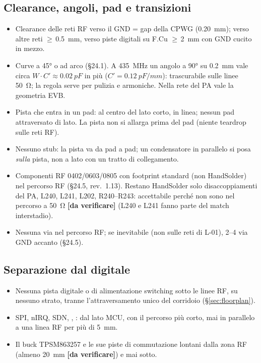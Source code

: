 \documentclass[a4paper,10pt]{article}
\newcommand{\net}[1]{\texttt{\detokenize{#1}}}
\newcommand{\dv}{\textcolor{verfr}{\textbf{[da verificare]}}}
\newcounter{regola}
\begin{document}
\subsection{Clearance, angoli, pad e transizioni}
\begin{regola}
\begin{itemize}
\item Clearance delle reti RF verso il GND = gap della CPWG (\SI{0.20}{mm}); verso altre reti
      $\ge$\,\SI{0.5}{mm}, verso piste digitali su F.Cu $\ge$\,\SI{2}{mm} con GND cucito in mezzo.
\item Curve a \ang{45} o ad arco (\S24.1). A \SI{435}{MHz} un angolo a \ang{90} su \SI{0.2}{mm} vale circa
      $W\cdot C'\approx\SI{0.02}{pF}$ in più ($C'=\SI{0.12}{pF/mm}$): trascurabile sulle linee \SI{50}{\ohm};
      la regola serve per pulizia e armoniche. Nella rete del PA vale la geometria EVB.
\item Pista che entra in un pad: al centro del lato corto, in linea; nessun pad attraversato di lato.
      La pista non si allarga prima del pad (niente teardrop sulle reti RF).
\item Nessuno stub: la pista va da pad a pad; un condensatore in parallelo si posa \emph{sulla} pista, non
      a lato con un tratto di collegamento.
\item Componenti RF 0402/0603/0805 con footprint standard (non HandSolder) nel percorso RF (\S24.5,
      rev.~1.13). Restano HandSolder solo disaccoppiamenti del PA, L240, L241, L202, R240--R243: accettabile
      perché non sono nel percorso a \SI{50}{\ohm} \dv{} (L240 e L241 fanno parte del match interstadio).
\item Nessuna via nel percorso RF; se inevitabile (non sulle reti di L-01), 2--4 via GND accanto (\S24.5).
\end{itemize}
\end{regola}

\subsection{Separazione dal digitale}
\begin{regola}[digitale]
\begin{itemize}
\item Nessuna pista digitale o di alimentazione switching sotto le linee RF, su nessuno strato, tranne
      l'attraversamento unico del corridoio (\S\ref{sec:floorplan}).
\item SPI, nIRQ, SDN, \net{EN_TX_ANT_SW}, \net{EN_RX_LNA}: dal lato MCU, con il percorso più corto, mai in
      parallelo a una linea RF per più di \SI{5}{mm}.
\item Il buck TPSM863257 e le sue piste di commutazione lontani dalla zona RF (almeno \SI{20}{mm} \dv) e
      mai sotto.
\end{itemize}
\end{regola}
\end{document}
